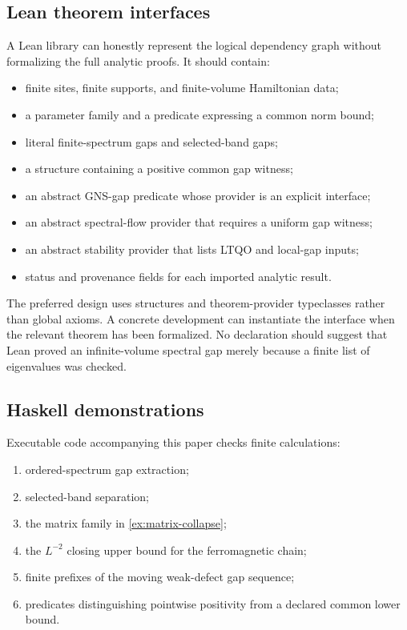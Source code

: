 \documentclass[12pt]{article}
\theoremstyle{definition}
\theoremstyle{remark}
\begin{document}
\subsection{Lean theorem interfaces}

A Lean library can honestly represent the logical dependency graph without
formalizing the full analytic proofs. It should contain:

\begin{itemize}
  \item finite sites, finite supports, and finite-volume Hamiltonian data;
  \item a parameter family and a predicate expressing a common norm bound;
  \item literal finite-spectrum gaps and selected-band gaps;
  \item a structure containing a positive common gap witness;
  \item an abstract GNS-gap predicate whose provider is an explicit interface;
  \item an abstract spectral-flow provider that requires a uniform gap witness;
  \item an abstract stability provider that lists LTQO and local-gap inputs;
  \item status and provenance fields for each imported analytic result.
\end{itemize}

The preferred design uses structures and theorem-provider typeclasses rather
than global axioms. A concrete development can instantiate the interface when
the relevant theorem has been formalized. No declaration should suggest that
Lean proved an infinite-volume spectral gap merely because a finite list of
eigenvalues was checked.

\subsection{Haskell demonstrations}

Executable code accompanying this paper checks finite calculations:

\begin{enumerate}[label=\arabic*.]
  \item ordered-spectrum gap extraction;
  \item selected-band separation;
  \item the matrix family in \cref{ex:matrix-collapse};
  \item the $L^{-2}$ closing upper bound for the ferromagnetic chain;
  \item finite prefixes of the moving weak-defect gap sequence;
  \item predicates distinguishing pointwise positivity from a declared common
  lower bound.
\end{enumerate}
\end{document}
